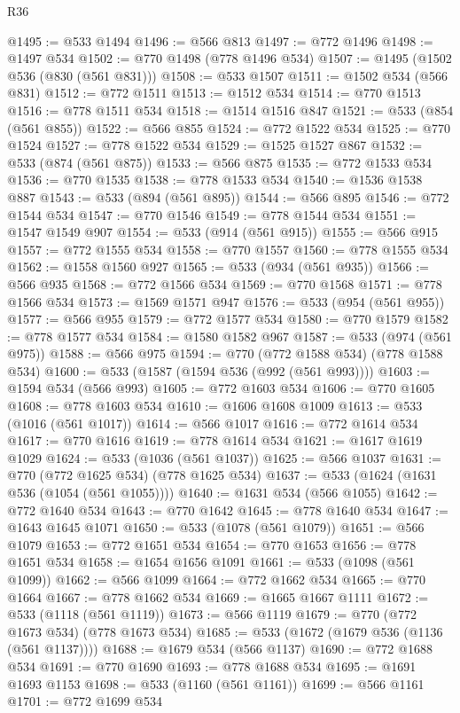 \begin{lexlean}{R36}
\begin{coremodule}
@1495 := @533 @1494
@1496 := @566 @813
@1497 := @772 @1496
@1498 := @1497 @534
@1502 := @770 @1498 (@778 @1496 @534)
@1507 := @1495 (@1502 @536 (@830 (@561 @831)))
@1508 := @533 @1507
@1511 := @1502 @534 (@566 @831)
@1512 := @772 @1511
@1513 := @1512 @534
@1514 := @770 @1513
@1516 := @778 @1511 @534
@1518 := @1514 @1516 @847
@1521 := @533 (@854 (@561 @855))
@1522 := @566 @855
@1524 := @772 @1522 @534
@1525 := @770 @1524
@1527 := @778 @1522 @534
@1529 := @1525 @1527 @867
@1532 := @533 (@874 (@561 @875))
@1533 := @566 @875
@1535 := @772 @1533 @534
@1536 := @770 @1535
@1538 := @778 @1533 @534
@1540 := @1536 @1538 @887
@1543 := @533 (@894 (@561 @895))
@1544 := @566 @895
@1546 := @772 @1544 @534
@1547 := @770 @1546
@1549 := @778 @1544 @534
@1551 := @1547 @1549 @907
@1554 := @533 (@914 (@561 @915))
@1555 := @566 @915
@1557 := @772 @1555 @534
@1558 := @770 @1557
@1560 := @778 @1555 @534
@1562 := @1558 @1560 @927
@1565 := @533 (@934 (@561 @935))
@1566 := @566 @935
@1568 := @772 @1566 @534
@1569 := @770 @1568
@1571 := @778 @1566 @534
@1573 := @1569 @1571 @947
@1576 := @533 (@954 (@561 @955))
@1577 := @566 @955
@1579 := @772 @1577 @534
@1580 := @770 @1579
@1582 := @778 @1577 @534
@1584 := @1580 @1582 @967
@1587 := @533 (@974 (@561 @975))
@1588 := @566 @975
@1594 := @770 (@772 @1588 @534) (@778 @1588 @534)
@1600 := @533 (@1587 (@1594 @536 (@992 (@561 @993))))
@1603 := @1594 @534 (@566 @993)
@1605 := @772 @1603 @534
@1606 := @770 @1605
@1608 := @778 @1603 @534
@1610 := @1606 @1608 @1009
@1613 := @533 (@1016 (@561 @1017))
@1614 := @566 @1017
@1616 := @772 @1614 @534
@1617 := @770 @1616
@1619 := @778 @1614 @534
@1621 := @1617 @1619 @1029
@1624 := @533 (@1036 (@561 @1037))
@1625 := @566 @1037
@1631 := @770 (@772 @1625 @534) (@778 @1625 @534)
@1637 := @533 (@1624 (@1631 @536 (@1054 (@561 @1055))))
@1640 := @1631 @534 (@566 @1055)
@1642 := @772 @1640 @534
@1643 := @770 @1642
@1645 := @778 @1640 @534
@1647 := @1643 @1645 @1071
@1650 := @533 (@1078 (@561 @1079))
@1651 := @566 @1079
@1653 := @772 @1651 @534
@1654 := @770 @1653
@1656 := @778 @1651 @534
@1658 := @1654 @1656 @1091
@1661 := @533 (@1098 (@561 @1099))
@1662 := @566 @1099
@1664 := @772 @1662 @534
@1665 := @770 @1664
@1667 := @778 @1662 @534
@1669 := @1665 @1667 @1111
@1672 := @533 (@1118 (@561 @1119))
@1673 := @566 @1119
@1679 := @770 (@772 @1673 @534) (@778 @1673 @534)
@1685 := @533 (@1672 (@1679 @536 (@1136 (@561 @1137))))
@1688 := @1679 @534 (@566 @1137)
@1690 := @772 @1688 @534
@1691 := @770 @1690
@1693 := @778 @1688 @534
@1695 := @1691 @1693 @1153
@1698 := @533 (@1160 (@561 @1161))
@1699 := @566 @1161
@1701 := @772 @1699 @534

\end{coremodule}
\end{lexlean}
